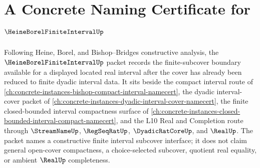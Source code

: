 \chapter{A Concrete Naming Certificate for $\HeineBorelFiniteIntervalUp$}
\label{ch:concrete-instances-heine-borel-finite-interval-namecert}

Following Heine, Borel, and Bishop--Bridges constructive analysis, the $\HeineBorelFiniteIntervalUp$ packet records the finite-subcover boundary available for a displayed located real interval after the cover has already been reduced to finite dyadic interval data. It sits beside the compact interval route of \autoref{ch:concrete-instances-bishop-compact-interval-namecert}, the dyadic interval-cover packet of \autoref{ch:concrete-instances-dyadic-interval-cover-namecert}, the finite closed-bounded interval compactness surface of \autoref{ch:concrete-instances-closed-bounded-interval-compact-namecert}, and the L10 Real and Completion route through $\StreamNameUp$, $\RegSeqRatUp$, $\DyadicRatCoreUp$, and $\RealUp$. The packet names a constructive finite interval subcover interface; it does not claim general open-cover compactness, a choice-selected subcover, quotient real equality, or ambient $\RealUp$ completeness.

